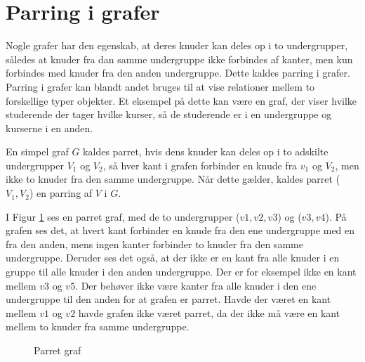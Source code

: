 



\section{Parring i grafer}
Nogle grafer har den egenskab, at deres knuder kan deles op i to undergrupper, således at knuder fra dan samme undergruppe ikke forbindes af kanter, men kun forbindes med knuder fra den anden undergruppe.
Dette kaldes parring i grafer.
Parring i grafer kan blandt andet bruges til at vise relationer mellem to forskellige typer objekter.
Et eksempel på dette kan være en graf, der viser hvilke studerende der tager hvilke kurser, så de studerende er i en undergruppe og kurserne i en anden. 

\begin{defn}
En simpel graf $G$ kaldes parret, hvis dens knuder kan deles op i to adskilte undergrupper $V_1$ og $V_2$, så hver kant i grafen forbinder en knude fra $v_1$ og $V_2$, men ikke to knuder fra den samme undergruppe.
Når dette gælder, kaldes parret ($V_1,V_2$) en parring af $V$ i $G$.
\end{defn}

\begin{exmp}
I Figur \ref{parret_graf} ses en parret graf, med de to undergrupper ($v1,v2,v3$) og ($v3,v4$). 
På grafen ses det, at hvert kant forbinder en knude fra den ene undergruppe med en fra den anden, mens ingen kanter forbinder to knuder fra den samme undergruppe. 
Deruder ses det også, at der ikke er en kant fra alle knuder i en gruppe til alle knuder i den anden undergruppe.
Der er for eksempel ikke en kant mellem $v3$ og $v5$. 
Der behøver ikke være kanter fra alle knuder i den ene undergruppe til den anden for at grafen er parret.
Havde der været en kant mellem $v1$ og $v2$ havde grafen ikke været parret, da der ikke må være en kant mellem to knuder fra samme undergruppe.
\end{exmp}

\begin{figure}
\centering
{}
\caption{Parret graf}
\label{parret_graf}
\end{figure}

